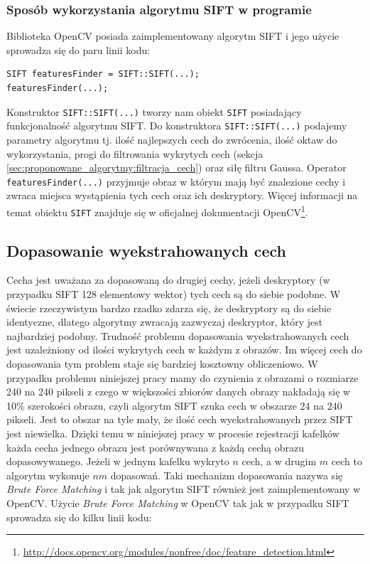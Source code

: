 \subsubsection{Sposób wykorzystania algorytmu SIFT w programie}
\label{sec:proponowane_algorytmy:sift_wykorzystanie}

Biblioteka OpenCV posiada zaimplementowany algorytm SIFT i jego użycie sprowadza się do paru linii kodu:

\begin{verbatim}
SIFT featuresFinder = SIFT::SIFT(...);
featuresFinder(...);
\end{verbatim}

Konstruktor \texttt{SIFT::SIFT(...)} tworzy nam obiekt \texttt{SIFT} posiadający funkcjonalność algorytmu SIFT. Do konstruktora \texttt{SIFT::SIFT(...)} podajemy parametry algorytmu tj. ilość najlepszych cech do zwrócenia, ilość oktaw do wykorzystania, progi do filtrowania wykrytych cech (sekcja \ref{sec:proponowane_algorytmy:filtracja_cech}) oraz siłę filtru Gaussa. Operator \texttt{featuresFinder(...)} przyjmuje obraz w którym mają być znalezione cechy i zwraca miejsca wystąpienia tych cech oraz ich deskryptory. Więcej informacji na temat obiektu \texttt{SIFT} znajduje się w oficjalnej dokumentacji OpenCV\footnote{\url{http://docs.opencv.org/modules/nonfree/doc/feature_detection.html}}.

\subsection{Dopasowanie wyekstrahowanych cech}
\label{sec:proponowane_algorytmy:dopasowanie}

Cecha jest uważana za dopasowaną do drugiej cechy, jeżeli deskryptory (w przypadku SIFT 128 elementowy wektor) tych cech są do siebie podobne. W świecie rzeczywistym bardzo rzadko zdarza się, że deskryptory są do siebie identyczne, dlatego algorytmy zwracają zazwyczaj deskryptor, który jest najbardziej podobny. Trudność problemu dopasowania wyekstrahowanych cech jest uzależniony od ilości wykrytych cech w każdym z obrazów. Im więcej cech do dopasowania tym problem staje się bardziej kosztowny obliczeniowo. W przypadku problemu niniejszej pracy mamy do czynienia z obrazami o rozmiarze 240 na 240 pikseli z czego w większości zbiorów danych obrazy nakładają się w 10\% szerokości obrazu, czyli algorytm SIFT szuka cech w obszarze 24 na 240 pikseli. Jest to obszar na tyle mały, że ilość cech wyekstrahowanych przez SIFT jest niewielka. Dzięki temu w niniejszej pracy w procesie rejestracji kafelków każda cecha jednego obrazu jest porównywana z każdą cechą obrazu dopasowywanego. Jeżeli w jednym kafelku wykryto $n$ cech, a w drugim $m$ cech to algorytm wykonuje $nm$ dopasowań. Taki mechanizm dopasowania nazywa się \textit{Brute Force Matching} i tak jak algorytm SIFT również jest zaimplementowany w OpenCV. Użycie \textit{Brute Force Matching} w OpenCV tak jak w przypadku SIFT sprowadza się do kilku linii kodu:

